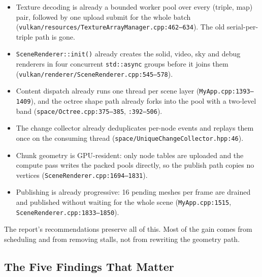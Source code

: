 \documentclass[11pt,a4paper]{article}
\begin{document}
\begin{itemize}[leftmargin=1.4em,itemsep=2pt]
\item Texture decoding is already a bounded worker pool over every
(triple, map) pair, followed by one upload submit for the whole batch
(\texttt{vulkan/resources/TextureArrayManager.cpp:462--634}). The old
serial-per-triple path is gone.
\item \texttt{SceneRenderer::init()} already creates the solid, video, sky
and debug renderers in four concurrent \texttt{std::async} groups before it
joins them (\texttt{vulkan/renderer/SceneRenderer.cpp:545--578}).
\item Content dispatch already runs one thread per scene layer
(\texttt{MyApp.cpp:1393--1409}), and the octree shape path already forks into
the pool with a two-level band (\texttt{space/Octree.cpp:375--385},
\texttt{:392--506}).
\item The change collector already deduplicates per-node events and replays
them once on the consuming thread (\texttt{space/UniqueChangeCollector.hpp:46}).
\item Chunk geometry is GPU-resident: only node tables are uploaded and the
compute pass writes the packed pools directly, so the publish path copies no
vertices (\texttt{SceneRenderer.cpp:1694--1831}).
\item Publishing is already progressive: 16 pending meshes per frame are
drained and published without waiting for the whole scene
(\texttt{MyApp.cpp:1515}, \texttt{SceneRenderer.cpp:1833--1850}).
\end{itemize}

The report's recommendations preserve all of this. Most of the gain comes from
scheduling and from removing stalls, not from rewriting the geometry path.

\subsection{The Five Findings That Matter}
\end{document}
